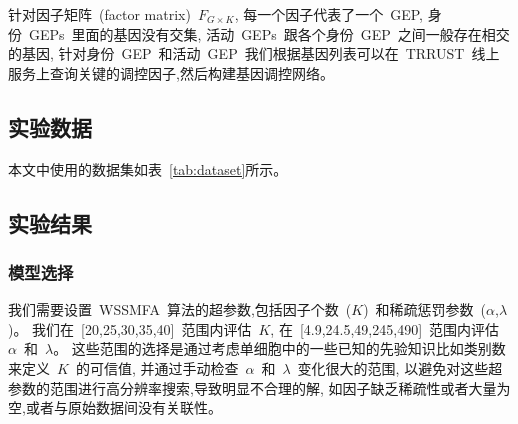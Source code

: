 针对因子矩阵~(factor matrix)~$F_{G \times K}$, 每一个因子代表了一个~GEP, 
身份~GEPs~里面的基因没有交集, 活动~GEPs~跟各个身份~GEP~之间一般存在相交的基因, 
针对身份~GEP~和活动~GEP~我们根据基因列表可以在~TRRUST~线上服务上查询关键的调控因子,然后构建基因调控网络。

\subsection{实验数据}
本文中使用的数据集如表~\ref{tab:dataset}所示。
\begin{table}[!htbp]
    \caption{\label{tab:dataset}使用的公开数据集} 
\end{table}

\subsection{实验结果}
\subsubsection{模型选择}
我们需要设置~WSSMFA~算法的超参数,包括因子个数~($K$)~和稀疏惩罚参数~($\alpha$,$\lambda$)。
我们在~[20,25,30,35,40]~范围内评估~$K$, 在~[4.9,24.5,49,245,490]~范围内评估~$\alpha$~和~$\lambda$。
这些范围的选择是通过考虑单细胞中的一些已知的先验知识比如类别数来定义~$K$~的可信值,
并通过手动检查~$\alpha$~和~$\lambda$~变化很大的范围,
以避免对这些超参数的范围进行高分辨率搜索,导致明显不合理的解,
如因子缺乏稀疏性或者大量为空,或者与原始数据间没有关联性。

